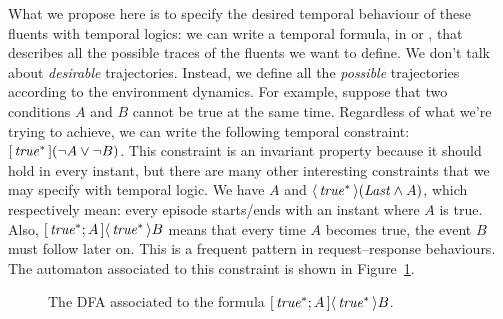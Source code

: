 What we propose here is to specify the desired temporal behaviour of these
fluents with temporal logics: we can write a temporal formula, in \ltl{} or
\ldl{}, that describes all the possible traces of the fluents we want to
define. We don't talk about \emph{desirable} trajectories. Instead, we define
all the \emph{possible} trajectories according to the environment dynamics.
For example, suppose that two conditions $A$ and $B$ cannot be true at
the same time. Regardless of what we're trying to achieve, we can write the
following temporal constraint: $[\, {\text{\textit{true}}^*} \,](\neg A \lor \neg B)$.
This constraint is an invariant property because it should hold in every
instant, but there are many other interesting constraints that we may specify
with temporal logic. We have $A$ and $\langle\, {\text{\textit{true}}^*} \,\rangle(\text{\textit{Last}} \land A)$,
which respectively mean: every episode starts/ends with an instant where $A$
is true.  Also, $[\, {\text{\textit{true}}^*; A} \,]\langle\, {\text{\textit{true}}^*} \,\rangle B$ means that every
time $A$ becomes true, the event $B$ must follow later on. This is a frequent
pattern in request--response behaviours. The automaton associated to this
constraint is shown in Figure~\ref{fig:response-automa}.
\begin{figure}
		\centering
		\caption{The DFA associated to the formula ${[\, {\text{\textit{true}}^*;
			A} \,]\langle\, {\text{\textit{true}}^*} \,\rangle B}$.}
		\label{fig:response-automa}
\end{figure}

